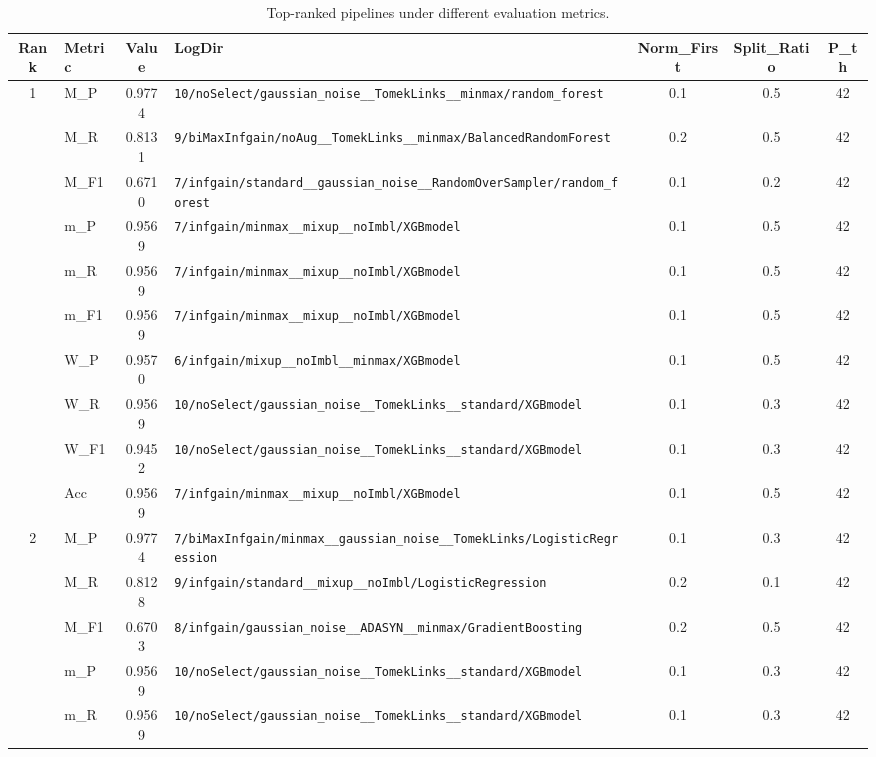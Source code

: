 \begin{table}[htbp]
\caption{Top-ranked pipelines under different evaluation metrics.}
\label{tab:rank_metric_vertical}
\centering
\small
\setlength{\tabcolsep}{4pt}
\begin{tabular}{|c|l|c|>{\ttfamily\footnotesize}p{7.2cm}|c|c|c|}
\hline
Rank & Metric & Value & LogDir & Norm\_First & Split\_Ratio & P\_th \\
\hline
\multirow{10}{*}{1} & M\_P & 0.9774 & \texttt{10/noSelect/gaussian\_noise\_\_TomekLinks\_\_minmax/random\_forest} & 0.1 & 0.5  & 42 \\ 
 & M\_R & 0.8131 & \texttt{9/biMaxInfgain/noAug\_\_TomekLinks\_\_minmax/BalancedRandomForest} & 0.2 & 0.5  & 42 \\ 
 & M\_F1 & 0.6710 & \texttt{7/infgain/standard\_\_gaussian\_noise\_\_RandomOverSampler/random\_forest} & 0.1 & 0.2  & 42 \\ 
 & m\_P & 0.9569 & \texttt{7/infgain/minmax\_\_mixup\_\_noImbl/XGBmodel} & 0.1 & 0.5  & 42 \\ 
 & m\_R & 0.9569 & \texttt{7/infgain/minmax\_\_mixup\_\_noImbl/XGBmodel} & 0.1 & 0.5  & 42 \\ 
 & m\_F1 & 0.9569 & \texttt{7/infgain/minmax\_\_mixup\_\_noImbl/XGBmodel} & 0.1 & 0.5  & 42 \\ 
 & W\_P & 0.9570 & \texttt{6/infgain/mixup\_\_noImbl\_\_minmax/XGBmodel} & 0.1 & 0.5  & 42 \\ 
 & W\_R & 0.9569 & \texttt{10/noSelect/gaussian\_noise\_\_TomekLinks\_\_standard/XGBmodel} & 0.1 & 0.3  & 42 \\ 
 & W\_F1 & 0.9452 & \texttt{10/noSelect/gaussian\_noise\_\_TomekLinks\_\_standard/XGBmodel} & 0.1 & 0.3  & 42 \\ 
 & Acc & 0.9569 & \texttt{7/infgain/minmax\_\_mixup\_\_noImbl/XGBmodel} & 0.1 & 0.5  & 42 \\ 
\hline
\multirow{10}{*}{2} & M\_P & 0.9774 & \texttt{7/biMaxInfgain/minmax\_\_gaussian\_noise\_\_TomekLinks/LogisticRegression} & 0.1 & 0.3  & 42 \\ 
 & M\_R & 0.8128 & \texttt{9/infgain/standard\_\_mixup\_\_noImbl/LogisticRegression} & 0.2 & 0.1  & 42 \\ 
 & M\_F1 & 0.6703 & \texttt{8/infgain/gaussian\_noise\_\_ADASYN\_\_minmax/GradientBoosting} & 0.2 & 0.5  & 42 \\ 
 & m\_P & 0.9569 & \texttt{10/noSelect/gaussian\_noise\_\_TomekLinks\_\_standard/XGBmodel} & 0.1 & 0.3  & 42 \\ 
 & m\_R & 0.9569 & \texttt{10/noSelect/gaussian\_noise\_\_TomekLinks\_\_standard/XGBmodel} & 0.1 & 0.3  & 42 \\ 

\end{tabular}
\end{table}
